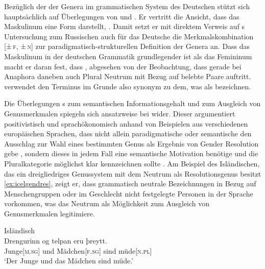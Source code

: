 Bezüglich der  der Genera im grammatischen System des
Deutschen stützt sich \citet{askedal1973} hauptsächlich auf Überlegungen von
\citet{jakobson1932} und \citet{bierwisch1967}. Er vertritt die Ansicht, dass
das Maskulinum eine  Form darstellt,
. Damit setzt er mit
direktem Verweis auf \citeauthor{jakobson1932}s Untersuchung zum Russischen
auch für das Deutsche die Merkmalskombination [\textsc{±\,f, ±\,n}] zur
paradigmatisch-struktu\-rellen Definition der Genera an. Dass das Maskulinum in
der deutschen Grammatik grundlegender ist als das Femininum macht er daran
fest, dass , abgesehen von der Beobachtung,
dass gerade bei Anaphora daneben auch Plural Neutrum mit Bezug auf belebte
Paare auftritt. \citet{askedal1973} verwendet den Terminus  im
Grunde also synonym zu dem, was \textcites[205--218]{corbett1991}{wechsler2009}
als  bezeichnen.

Die Überlegungen \citeauthor{askedal1973}s zum semantischen Informationsgehalt
und zum Ausgleich von Genusmerkmalen spiegeln sich ansatzweise bei
\citet{corbett1991} wider. Dieser argumentiert positivistisch und
sprachökonomisch anhand von Beispielen aus verschiedenen europäischen Sprachen,
dass nicht allein paradigmatische oder semantische  den
Ausschlag zur Wahl eines bestimmten Genus als Ergebnis von Gender Resolution
gebe \autocite[290--293]{corbett1991}, sondern dieses  in
jedem Fall eine semantische Motivation benötige und die Plural\-kategorie
möglichst klar kennzeichnen sollte \autocite[293--299]{corbett1991}. Am
Beispiel des Isländischen, das ein dreigliedriges Genussystem mit dem Neutrum
als Resolutionsgenus besitzt \cref{ex:icelgendres}, zeigt er, dass grammatisch
neutrale Bezeichnungen in Bezug auf Menschen\-gruppen oder im Geschlecht nicht
festgelegte Personen in der Sprache vorkommen, was das Neutrum als Möglichkeit
zum Ausgleich von Genusmerkmalen legiti\-miere.

\begin{exe}
\ex \label{ex:icelgendres}
	\langinfo%
		{Isländisch}%
		{}
		{\cites[nach][283]{corbett1991}[569]{wechsler2009}}\\
	\gll Drengurinn og telpan eru þreytt. \\
		Junge[\textsc{m.sg}] und Mädchen[\textsc{f.sg}] sind
		müde[\textsc{n.pl}] \\
	\trans `Der Junge und das Mädchen sind müde.'
\end{exe}

